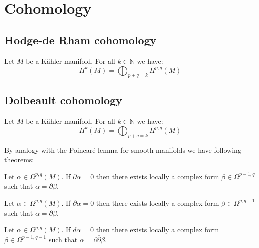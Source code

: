 \section{Cohomology}
\subsection{Hodge-de Rham cohomology}


	\begin{theorem}
		Let $M$ be a K\"ahler manifold. For all $k\in\mathbb{N}$ we have:
		\begin{equation}
			H^k(M) = \bigoplus_{p+q=k}H^{p, q}(M)
		\end{equation}
	\end{theorem}

\subsection{Dolbeault cohomology}
	
	\begin{theorem}
		Let $M$ be a K\"ahler manifold. For all $k\in\mathbb{N}$ we have:
		\begin{equation}
			H^k(M) = \bigoplus_{p+q=k}H^{p, q}(M)
		\end{equation}
	\end{theorem}
	
	By analogy with the Poincar\'e lemma for smooth manifolds we have following theorems:
	\begin{theorem}
		Let $\alpha\in\Omega^{p, q}(M)$. If $\partial\alpha = 0$ then there exists locally a complex form $\beta\in\Omega^{p-1, q}$ such that $\alpha = \partial\beta$.
	\end{theorem}
	\begin{theorem}
		Let $\alpha\in\Omega^{p, q}(M)$. If $\overline{\partial}\alpha = 0$ then there exists locally a complex form $\beta\in\Omega^{p, q-1}$ such that $\alpha = \overline{\partial}\beta$.
	\end{theorem}
	\begin{theorem}\label{complex:del_delbar_lemma}
		Let $\alpha\in\Omega^{p, q}(M)$. If $d\alpha = 0$ then there exists locally a complex form $\beta\in\Omega^{p-1, q-1}$ such that $\alpha = \partial\overline{\partial}\beta$.
	\end{theorem}
